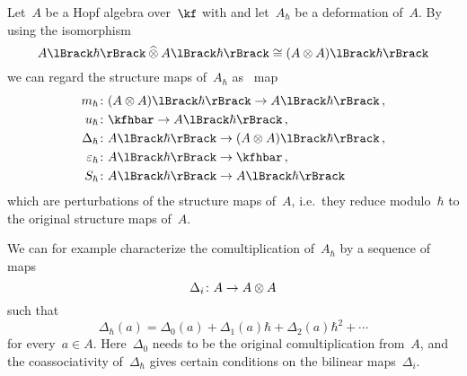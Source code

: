 \documentclass[a4paper, 11pt, oneside]{scrartcl}
\begin{document}
\begin{remark}
  Let~$A$ be a Hopf algebra over~$\kf$ with and let~$A_{\hbar}$ be a deformation of~$A$.
  By using the isomorphism
  \[
    \power{A}{\hbar} \ctensor \power{A}{\hbar}
    \cong
    \power{(A \tensor A)}{\hbar}
  \]
  we can regard the structure maps of~$A_{\hbar}$ as~\linear{$\kfhbar$} map
  \begin{equation}
    \label{explicit description of deformed hopf algebra}
    \begin{aligned}
      m_{\hbar} &\colon \power{(A \tensor A)}{\hbar} \to \power{A}{\hbar} \,,
      \\
      u_{\hbar} &\colon \kfhbar \to \power{A}{\hbar} \,,
      \\
      \Delta_{\hbar} &\colon \power{A}{\hbar} \to \power{(A \tensor A)}{\hbar} \,,
      \\
      \varepsilon_{\hbar} &\colon \power{A}{\hbar} \to \kfhbar \,,
      \\
      S_{\hbar} &\colon \power{A}{\hbar} \to \power{A}{\hbar}
    \end{aligned}
  \end{equation}
  which are perturbations of the structure maps of~$A$, i.e.\ they reduce modulo~$\hbar$ to the original structure maps of~$A$.

  We can for example characterize the comultiplication of~$A_{\hbar}$ by a sequence of~\bilinear{$\kf$} maps
  \[
    \Delta_i \colon A \to A \otimes A
  \]
  such that
  \[
    \Delta_{\hbar}(a)
    =
    \Delta_0(a) + \Delta_1(a) \hbar + \Delta_2(a) \hbar^2 + \dotsb
  \]
  for every~$a \in A$.
  Here~$\Delta_0$ needs to be the original comultiplication from~$A$, and the coassociativity of~$\Delta_{\hbar}$ gives certain conditions on the bilinear maps~$\Delta_i$.
\end{remark}
\end{document}
